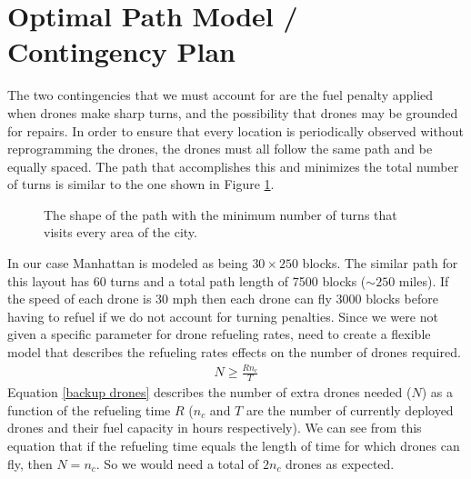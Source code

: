 \documentclass{article}
\begin{document}
\section{Optimal Path Model / Contingency Plan}
\label{sec:optimal_path_model}

The two contingencies that we must account for are the fuel penalty applied when drones make sharp turns, and the possibility that drones may be grounded for repairs. In order to ensure that every location is periodically observed without reprogramming the drones, the drones must all follow the same path and be equally spaced. The path that accomplishes this and minimizes the total number of turns is similar to the one shown in Figure \ref{path}.
\begin{figure}[htb!]
    \caption{The shape of the path with the minimum number of turns that visits every area of the city.}
    \label{path}
\end{figure}
\newline In our case Manhattan is modeled as being $30\times 250$ blocks. The similar path for this layout has 60 turns and a total path length of 7500 blocks ($\sim 250$ miles). If the speed of each drone is 30 mph then each drone can fly 3000 blocks before having to refuel if we do not account for turning penalties. Since we were not given a specific parameter for drone refueling rates, need to create a flexible model that describes the refueling rates effects on the number of drones required.
\begin{eqnarray}
N \geq \frac{R n_{c}}{T}\label{backup drones}
\end{eqnarray}
Equation \ref{backup drones} describes the number of extra drones needed ($N$) as a function of the refueling time $R$ ($n_{c}$ and $T$ are the number of currently deployed drones and their fuel capacity in hours respectively). We can see from this equation that if the refueling time equals the length of time for which drones can fly, then $N = n_{c}$.  So we would need a total of $2n_{c}$ drones as expected.
\end{document}
